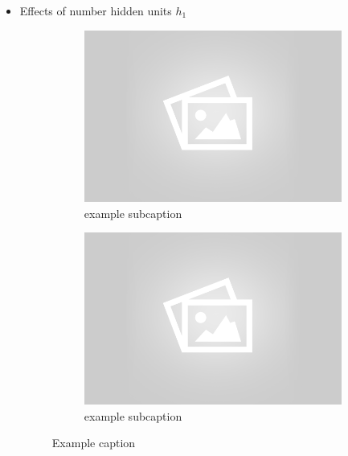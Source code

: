 \begin{itemize}
	\item Effects of number hidden units $h_1$
		\begin{figure}[!ht]
		\centering
		\begin{subfigure}[b]{.45\textwidth}
		\centering
		\includegraphics[width=\textwidth]{mlp/placeholder.png}
		\caption{example subcaption}
		\end{subfigure}
		\quad
		\begin{subfigure}[b]{.45\textwidth}
		\centering
		\includegraphics[width=\textwidth]{mlp/placeholder.png}
		\caption{example subcaption}
		\label{fig:subfigure2}
		\end{subfigure}
		\caption{Example caption}
		\label{fig:example}
		\end{figure}


\end{itemize}
